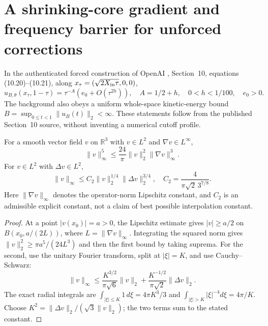 \section{A shrinking-core gradient and frequency barrier for unforced corrections}
\label{sec:xxxiii-shrinking}
In the authenticated forced construction of OpenAI \cite{openai2026},
Section~10, equations (10.20)--(10.21), along
$x_\tau=(\sqrt{2X_{\rm in}\tau},0,0)$,
\[
u_{B,\theta}(x_\tau,1-\tau)
=\tau^{-A}(e_0+O(\tau^{2h})),
\quad A=1/2+h,\quad 0<h<1/100,\quad e_0>0.
\]
The background also obeys a uniform whole-space kinetic-energy
bound $B=\sup_{0\le t<1}\|u_B(t)\|_2<\infty$.
These statements follow from the published Section~10 source,
without inventing a numerical cutoff profile.

\begin{lemma}
\label{lem:xxxiii-agn}
For a smooth vector field $v$ on $\mathbb R^3$ with
$v\in L^2$ and $\nabla v\in L^\infty$,
\[
\boxed{\quad\|v\|_\infty^5\le
\frac{24}{\pi}\|v\|_2^2\|\nabla v\|_\infty^3.\quad}
\]
For $v\in L^2$ with $\Delta v\in L^2$,
\[
\boxed{\quad\|v\|_\infty\le
C_2\|v\|_2^{1/4}\|\Delta v\|_2^{3/4},
\quad C_2=\frac4{\pi\sqrt2\,3^{7/8}}.\quad}
\]
Here $\|\nabla v\|_\infty$ denotes the operator-norm Lipschitz
constant, and $C_2$ is an admissible explicit constant,
not a claim of best possible interpolation constant.
\end{lemma}
\begin{proof}
At a point $|v(x_0)|=a>0$, the Lipschitz estimate gives
$|v|\ge a/2$ on $B(x_0,a/(2L))$, where
$L=\|\nabla v\|_\infty$. Integrating the squared norm
gives $\|v\|_2^2\ge\pi a^5/(24L^3)$ and then the
first bound by taking suprema.
For the second, use the unitary Fourier transform,
split at $|\xi|=K$, and use Cauchy--Schwarz:
\[
\|v\|_\infty\le
\frac{K^{3/2}}{\pi\sqrt6}\|v\|_2+
\frac{K^{-1/2}}{\pi\sqrt2}\|\Delta v\|_2.
\]
The exact radial integrals are
$\int_{|\xi|\le K}1\,d\xi=4\pi K^3/3$ and
$\int_{|\xi|>K}|\xi|^{-4}d\xi=4\pi/K$.
Choose $K^2=\|\Delta v\|_2/(\sqrt3\|v\|_2)$;
the two terms sum to the stated constant.
\end{proof}

